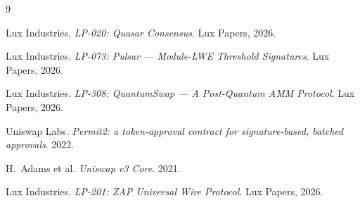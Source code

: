 \documentclass[11pt,a4paper]{article}
\begin{document}
\begin{thebibliography}{9}

 Lux Industries. \emph{LP-020: Quasar Consensus}.
Lux Papers, 2026.

 Lux Industries. \emph{LP-073: Pulsar --- Module-LWE
Threshold Signatures}. Lux Papers, 2026.

 Lux Industries. \emph{LP-308: QuantumSwap --- A
Post-Quantum AMM Protocol}. Lux Papers, 2026.

 Uniswap Labs. \emph{Permit2: a token-approval
contract for signature-based, batched approvals}. 2022.

 H.~Adams et al. \emph{Uniswap v3 Core}. 2021.

 Lux Industries. \emph{LP-201: ZAP Universal Wire
Protocol}. Lux Papers, 2026.

\end{thebibliography}
\end{document}
